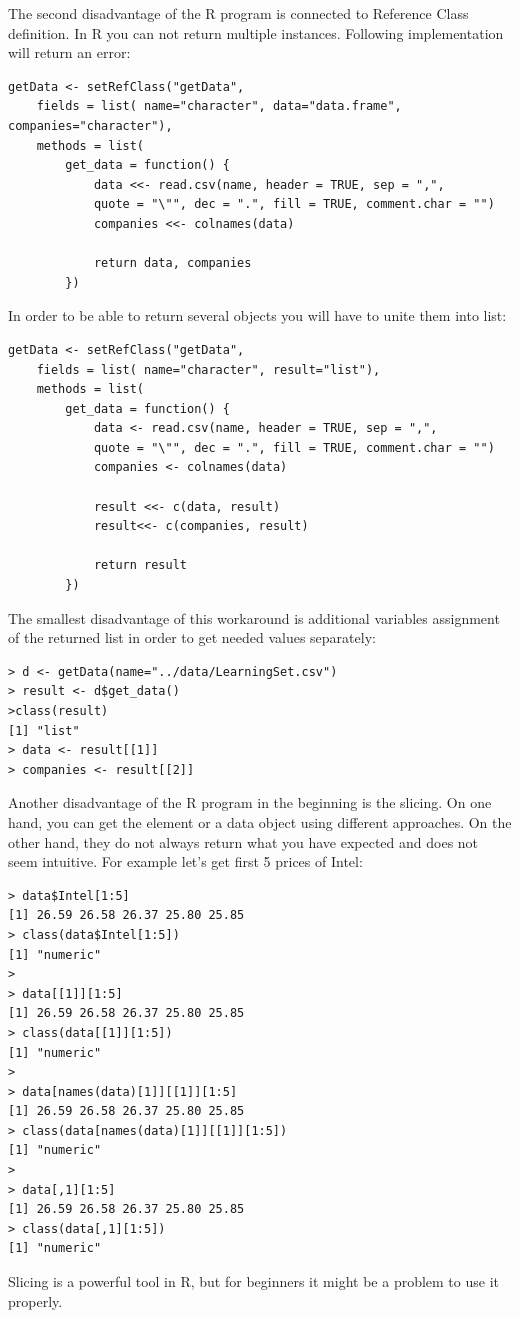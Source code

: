 \documentclass{article}
\begin{document}
The second disadvantage of the R program is connected to Reference Class definition. In R you can not return multiple instances. Following implementation will return an error:
\begin{verbatim}
getData <- setRefClass("getData",
    fields = list( name="character", data="data.frame", companies="character"),
	methods = list( 
    	get_data = function() {
            data <<- read.csv(name, header = TRUE, sep = ",", 
            quote = "\"", dec = ".", fill = TRUE, comment.char = "")
			companies <<- colnames(data)
			
			return data, companies
		})
\end{verbatim}
In order to be able to return several objects you will have to unite them into list:
\begin{verbatim}
getData <- setRefClass("getData",
    fields = list( name="character", result="list"),
	methods = list( 
    	get_data = function() {
            data <- read.csv(name, header = TRUE, sep = ",", 
            quote = "\"", dec = ".", fill = TRUE, comment.char = "")
			companies <- colnames(data)
            
            result <<- c(data, result)
            result<<- c(companies, result)
            
            return result            			
		})
\end{verbatim}
The smallest disadvantage of this workaround is additional variables assignment of the returned list in order to get needed values separately:
\begin{verbatim}
> d <- getData(name="../data/LearningSet.csv")
> result <- d$get_data()
>class(result)
[1] "list"
> data <- result[[1]]
> companies <- result[[2]]
\end{verbatim}
Another disadvantage of the R program in the beginning is the slicing. On one hand, you can get the element or a data object using different approaches. On the other hand, they do not always return what you have expected and does not seem intuitive. For example let's get first 5 prices of Intel:
\begin{verbatim}
> data$Intel[1:5]
[1] 26.59 26.58 26.37 25.80 25.85
> class(data$Intel[1:5])
[1] "numeric"
>
> data[[1]][1:5]
[1] 26.59 26.58 26.37 25.80 25.85
> class(data[[1]][1:5])
[1] "numeric"
>
> data[names(data)[1]][[1]][1:5]
[1] 26.59 26.58 26.37 25.80 25.85
> class(data[names(data)[1]][[1]][1:5])
[1] "numeric"
>
> data[,1][1:5]
[1] 26.59 26.58 26.37 25.80 25.85
> class(data[,1][1:5])
[1] "numeric"
\end{verbatim}
Slicing is a powerful tool in R, but for beginners it might be a problem to use it properly.
\end{document}
